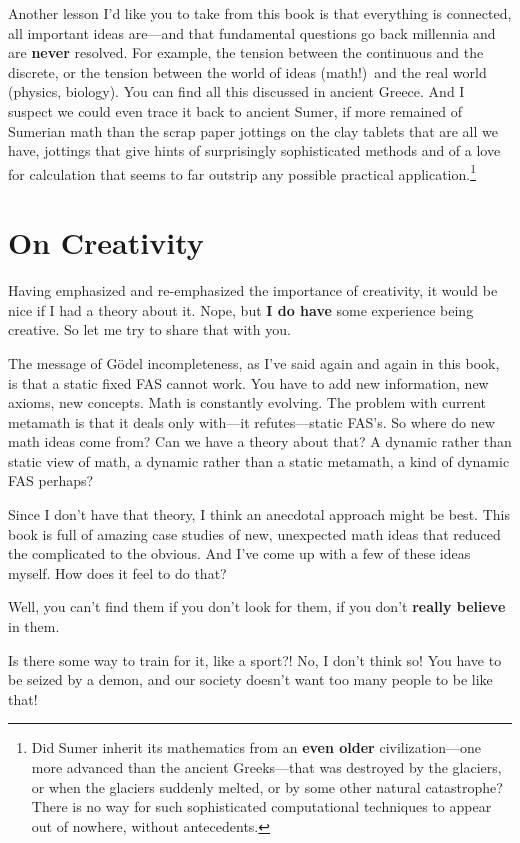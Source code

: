 \documentclass[12pt]{book}
\begin{document}
Another lesson I'd like you to take from this book is that everything is connected,
all important ideas are---and that fundamental
questions go back millennia and are \textbf{never} resolved.
For example, the tension between the continuous and the discrete, or 
the tension between the world of
ideas (math!)\ and the real world (physics, biology).
You can find all this discussed in ancient Greece. And I suspect 
we could even trace it back to ancient Sumer,
if more remained of
Sumerian math than the scrap paper jottings on the clay tablets that are all we have,
jottings that give hints of surprisingly sophisticated methods and of a love for calculation that
seems to far outstrip any possible practical application.\footnote
{Did Sumer inherit 
its mathematics from an \textbf{even older}
civilization---one more advanced than the ancient Greeks---that was destroyed by
the glaciers, or when the glaciers suddenly melted, or by some other natural catastrophe? 
There is no way for such sophisticated computational techniques to appear
out of nowhere, without antecedents.}

\section*{On Creativity}

Having emphasized and re-emphasized the importance of creativity,  it would be nice if I had
a theory about it.  Nope, but \textbf{I do have} some experience being
creative. So let me try to share that with you.
 
The message of G\"odel incompleteness, 
as I've said again and again in this book, is that a static fixed FAS cannot
work.  You have to add new information, new axioms, new concepts.  Math is constantly evolving.
The problem with current metamath is that it deals only with---it refutes---static FAS's.
So where do new math ideas come from?  Can we have a theory about that?
A dynamic rather than static view of math, a dynamic rather than a static metamath, a kind of
dynamic FAS perhaps?
 
Since I don't have that theory, I think an anecdotal approach might be best.  This book
is full of amazing case studies of new, unexpected math ideas that reduced the complicated
to the obvious. And I've come up with a few of these ideas myself.  How does it feel to do that?
 
Well, you can't find them if you don't look for them, if you don't \textbf{really believe} in them.
 
Is there some way to train for it, like a sport?!
No, I don't think so!  You have to be seized by a demon, and our society doesn't want
too many people to be like that!
 
\end{document}
